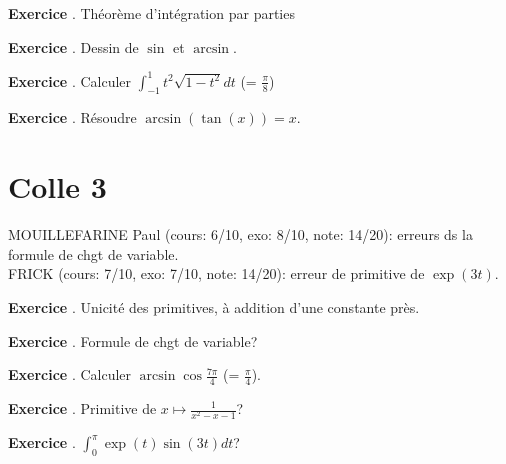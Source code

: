 \documentclass[10pt,a4paper]{article}
\newcounter{question}
\newcounter{exo}
\newenvironment{exo}{\vspace{0.5cm}\setcounter{question}{0}\addtocounter{exo}{1} \noindent \textbf{Exercice \theexo}. \normalsize }{\par}
\begin{document}
	\begin{exo}
		Théorème d'intégration par parties
	\end{exo}

	\begin{exo}
		Dessin de $\sin$ et $\arcsin$.
	\end{exo}
	
	\begin{exo}
		Calculer $\int_{-1}^{1} t^2 \sqrt{1 - t^2} dt$ (= $\frac{\pi}{8}$)
	\end{exo}
			
	\begin{exo}
		Résoudre $\arcsin(\tan(x)) = x$.
	\end{exo}
			
	\section*{Colle 3}
	\setcounter{exo}{0}
	MOUILLEFARINE Paul (cours: 6/10, exo: 8/10, note: 14/20): erreurs ds la formule de chgt de variable.\\
	FRICK (cours: 7/10, exo: 7/10, note: 14/20): erreur de primitive de $\exp(3t)$.\\
	
	\begin{exo}
		Unicité des primitives, à addition d'une constante près.
	\end{exo}

	\begin{exo}
		Formule de chgt de variable?
	\end{exo}

	\begin{exo}
		Calculer $\arcsin \cos \frac{7 \pi}{4}$ (= $\frac{\pi}{4}$).
	\end{exo}
	
	\begin{exo}
		Primitive de $x \longmapsto \frac{1}{x^2 - x - 1}$?
	\end{exo}

	\begin{exo}
		$\int_{0}^{\pi} \exp(t) \sin(3t) dt$?
	\end{exo}	
\end{document}
